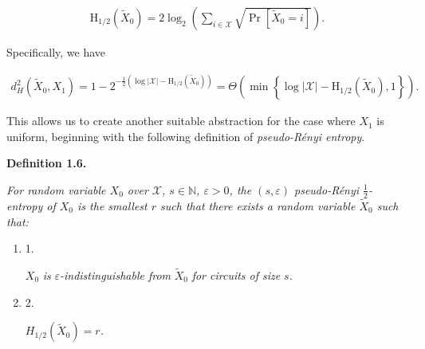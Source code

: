 \[\begin{gathered}
\mathrm{H}_{1/2}\left(\widetilde{X}_{0}\right)=2\log_{2}\left(\sum_{i\in\mathcal{X}}\sqrt{\Pr[\widetilde{X}_{0}=i]}\right).
\end{gathered}\]


Specifically, we have\par


\[\begin{gathered}
d_{H}^{2}\left(\widetilde{X}_{0},X_{1}\right)=1-2^{-\frac{1}{2}\left(\log|\mathcal{X}|-\mathrm{H}_{1/2}\left(\widetilde{X}_{0}\right)\right)}=\Theta\left(\min\left\{\log|\mathcal{X}|-\mathrm{H}_{1/2}\left(\widetilde{X}_{0}\right),1\right\}\right).
\end{gathered}\]


This allows us to create another suitable abstraction for the case where $X_{1}$ is uniform, beginning with the following definition of \emph{pseudo-Rényi entropy}.\par





\par\medskip\noindent\textbf{
\textbf{Definition 1.6}\textbf{.}
}\par



\emph{For random variable $X_{0}$ over $\mathcal{X}$, $s\in\mathbb{N}$, $\varepsilon>0$, the $(s,\varepsilon)$ pseudo-Rényi $\frac{1}{2}$-entropy of $X_{0}$ is the smallest $r$ such that there exists a random variable $\widetilde{X}_{0}$ such that:}\par


\begin{enumerate}


\item[] 
1. 


$X_{0}$\emph{ is }$\varepsilon$\emph{-indistinguishable from }$\widetilde{X}_{0}$\emph{ for circuits of size }$s$\emph{.}\par





\item[] 
2. 


$H_{1/2}\left(\widetilde{X}_{0}\right)=r$\emph{.}\par





\end{enumerate}



